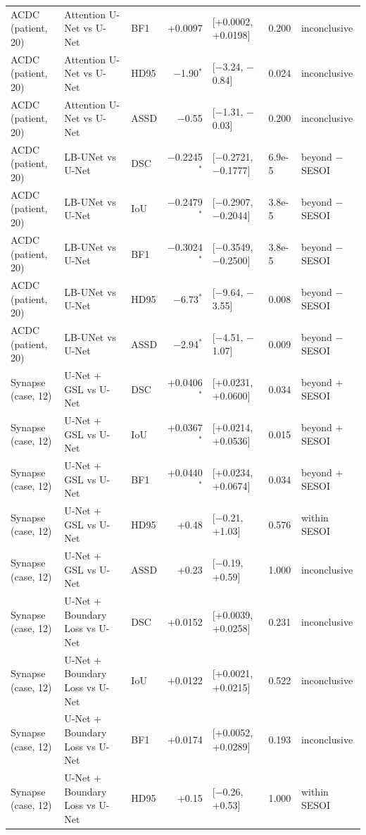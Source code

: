 \begin{tabular}{lllrlll}
ACDC (patient, 20) & Attention U-Net vs U-Net & BF1 & +0.0097 & [+0.0002, +0.0198] & 0.200 & inconclusive \\
ACDC (patient, 20) & Attention U-Net vs U-Net & HD95 & $-$1.90$^{*}$ & [$-$3.24, $-$0.84] & 0.024 & inconclusive \\
ACDC (patient, 20) & Attention U-Net vs U-Net & ASSD & $-$0.55 & [$-$1.31, $-$0.03] & 0.200 & inconclusive \\
ACDC (patient, 20) & LB-UNet vs U-Net & DSC & $-$0.2245$^{*}$ & [$-$0.2721, $-$0.1777] & 6.9e-5 & beyond $-$SESOI \\
ACDC (patient, 20) & LB-UNet vs U-Net & IoU & $-$0.2479$^{*}$ & [$-$0.2907, $-$0.2044] & 3.8e-5 & beyond $-$SESOI \\
ACDC (patient, 20) & LB-UNet vs U-Net & BF1 & $-$0.3024$^{*}$ & [$-$0.3549, $-$0.2500] & 3.8e-5 & beyond $-$SESOI \\
ACDC (patient, 20) & LB-UNet vs U-Net & HD95 & $-$6.73$^{*}$ & [$-$9.64, $-$3.55] & 0.008 & beyond $-$SESOI \\
ACDC (patient, 20) & LB-UNet vs U-Net & ASSD & $-$2.94$^{*}$ & [$-$4.51, $-$1.07] & 0.009 & beyond $-$SESOI \\
\midrule
Synapse (case, 12) & U-Net + GSL vs U-Net & DSC & +0.0406$^{*}$ & [+0.0231, +0.0600] & 0.034 & beyond $+$SESOI \\
Synapse (case, 12) & U-Net + GSL vs U-Net & IoU & +0.0367$^{*}$ & [+0.0214, +0.0536] & 0.015 & beyond $+$SESOI \\
Synapse (case, 12) & U-Net + GSL vs U-Net & BF1 & +0.0440$^{*}$ & [+0.0234, +0.0674] & 0.034 & beyond $+$SESOI \\
Synapse (case, 12) & U-Net + GSL vs U-Net & HD95 & +0.48 & [$-$0.21, +1.03] & 0.576 & within SESOI \\
Synapse (case, 12) & U-Net + GSL vs U-Net & ASSD & +0.23 & [$-$0.19, +0.59] & 1.000 & inconclusive \\
Synapse (case, 12) & U-Net + Boundary Loss vs U-Net & DSC & +0.0152 & [+0.0039, +0.0258] & 0.231 & inconclusive \\
Synapse (case, 12) & U-Net + Boundary Loss vs U-Net & IoU & +0.0122 & [+0.0021, +0.0215] & 0.522 & inconclusive \\
Synapse (case, 12) & U-Net + Boundary Loss vs U-Net & BF1 & +0.0174 & [+0.0052, +0.0289] & 0.193 & inconclusive \\
Synapse (case, 12) & U-Net + Boundary Loss vs U-Net & HD95 & +0.15 & [$-$0.26, +0.53] & 1.000 & within SESOI \\

\end{tabular}
